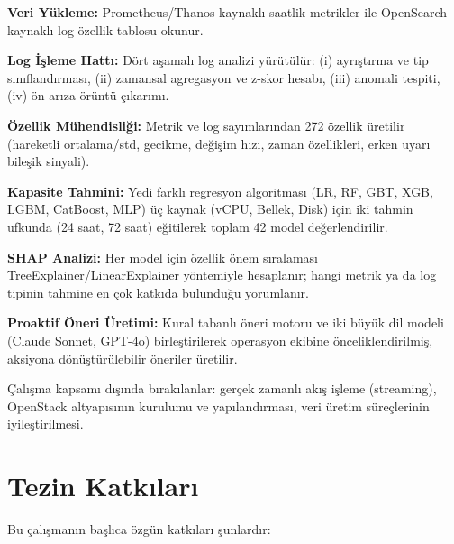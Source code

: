 \begin{maddelendir}[label=\textbf{Adım \arabic*.}]
    \item \textbf{Veri Yükleme:} Prometheus/Thanos kaynaklı saatlik metrikler ile OpenSearch kaynaklı log özellik tablosu okunur.

    \item \textbf{Log İşleme Hattı:} Dört aşamalı log analizi yürütülür: (i) ayrıştırma ve tip sınıflandırması, (ii) zamansal agregasyon ve z-skor hesabı, (iii) anomali tespiti, (iv) ön-arıza örüntü çıkarımı.

    \item \textbf{Özellik Mühendisliği:} Metrik ve log sayımlarından 272 özellik üretilir (hareketli ortalama/std, gecikme, değişim hızı, zaman özellikleri, erken uyarı bileşik sinyali).

    \item \textbf{Kapasite Tahmini:} Yedi farklı regresyon algoritması (LR, RF, GBT, XGB, LGBM, CatBoost, MLP) üç kaynak (vCPU, Bellek, Disk) için iki tahmin ufkunda (24 saat, 72 saat) eğitilerek toplam 42 model değerlendirilir.

    \item \textbf{SHAP Analizi:} Her model için özellik önem sıralaması TreeExplainer/LinearExplainer yöntemiyle hesaplanır; hangi metrik ya da log tipinin tahmine en çok katkıda bulunduğu yorumlanır.

    \item \textbf{Proaktif Öneri Üretimi:} Kural tabanlı öneri motoru ve iki büyük dil modeli (Claude Sonnet, GPT-4o) birleştirilerek operasyon ekibine önceliklendirilmiş, aksiyona dönüştürülebilir öneriler üretilir.
\end{maddelendir}

Çalışma kapsamı dışında bırakılanlar: gerçek zamanlı akış işleme (streaming), OpenStack altyapısının kurulumu ve yapılandırması, veri üretim süreçlerinin iyileştirilmesi.


\section{Tezin Katkıları}

Bu çalışmanın başlıca özgün katkıları şunlardır:


